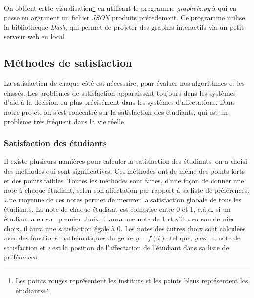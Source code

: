 \documentclass[12pt,titlepage]{article}
\begin{document}
On obtient cette visualisation\footnote{Les points rouges représentent les instituts et les points bleus représentent les étudiants} en utilisant le programme \textit{graphviz.py} à qui en passe en argument un fichier \textit{JSON} produits précedement. Ce programme utilise la bibliothèque \textit{Dash}, qui permet de projeter des graphes interactifs via un petit serveur web en local.

\subsection{Méthodes de satisfaction}
La satisfaction de chaque côté est nécessaire, pour évaluer nos algorithmes et les classés. Les problèmes de satisfaction apparaissent toujours dans les systèmes d'aid à la décision ou plus précisément dans les systèmes d'affectations. Dans notre projet, on s'est concentré sur la satisfaction des étudiants, qui est un problème très fréquent dans la vie réelle.
\subsubsection*{Satisfaction des étudiants}
Il existe plusieurs manières pour calculer la satisfaction des étudiants, on a choisi des méthodes qui sont significatives. Ces méthodes ont de même des points forts et des points faibles.
Toutes les méthodes sont faites, d'une façon de donner une note à chaque étudiant, selon son affectation par rapport à sa liste de préférences. Une moyenne de ces notes permet de mesurer la satisfaction globale de tous les étudiants.
La note de chaque étudiant est comprise entre 0 et 1, c.à.d. si un étudiant a eu son premier choix, il aura une note de 1 et s'il a eu son dernier choix, il aura une satisfaction égale à 0. Les notes des autres choix sont calculées avec des fonctions mathématiques du genre $y = f(i)$, tel que, \textit{y} est la note de satisfaction et \textit{i} est la position de l'affectation de l'étudiant dans sa liste de préférences. 
\end{document}

